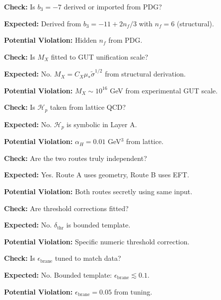 \documentclass[11pt,a4paper]{article}
\theoremstyle{definition}
\begin{document}
\begin{trapbox}
\textbf{Check:} Is $b_3 = -7$ derived or imported from PDG?

\textbf{Expected:} Derived from $b_3 = -11 + 2n_f/3$ with $n_f = 6$ (structural).

\textbf{Potential Violation:} Hidden $n_f$ from PDG.
\end{trapbox}

\begin{trapbox}
\textbf{Check:} Is $M_X$ fitted to GUT unification scale?

\textbf{Expected:} No. $M_X = C_X \mu_* \tilde{\sigma}^{1/2}$ from structural derivation.

\textbf{Potential Violation:} $M_X \sim 10^{16}$ GeV from experimental GUT scale.
\end{trapbox}

\begin{trapbox}
\textbf{Check:} Is $\mathcal{H}_p$ taken from lattice QCD?

\textbf{Expected:} No. $\mathcal{H}_p$ is symbolic in Layer A.

\textbf{Potential Violation:} $\alpha_H = 0.01$ GeV$^3$ from lattice.
\end{trapbox}

\begin{trapbox}
\textbf{Check:} Are the two routes truly independent?

\textbf{Expected:} Yes. Route A uses geometry, Route B uses EFT.

\textbf{Potential Violation:} Both routes secretly using same input.
\end{trapbox}

\begin{trapbox}
\textbf{Check:} Are threshold corrections fitted?

\textbf{Expected:} No. $\delta_{\text{thr}}$ is bounded template.

\textbf{Potential Violation:} Specific numeric threshold correction.
\end{trapbox}

\begin{trapbox}
\textbf{Check:} Is $\epsilon_{\text{brane}}$ tuned to match data?

\textbf{Expected:} No. Bounded template: $\epsilon_{\text{brane}} \lesssim 0.1$.

\textbf{Potential Violation:} $\epsilon_{\text{brane}} = 0.05$ from tuning.
\end{trapbox}
\end{document}
